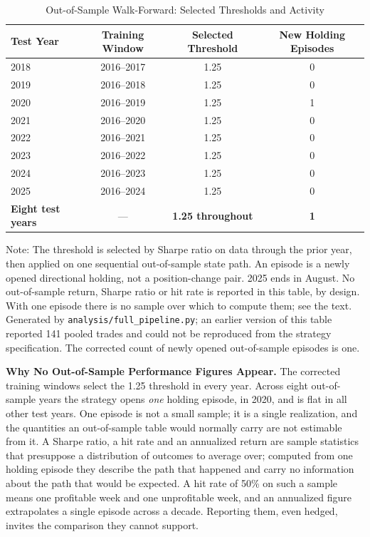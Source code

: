 \documentclass[11pt]{article}
\begin{document}
\begin{table}[H]
\centering
\caption{Out-of-Sample Walk-Forward: Selected Thresholds and Activity}
\label{tab:oos}
\small
\begin{tabular}{@{}lccc@{}}
\toprule
Test Year & Training Window & Selected Threshold & New Holding Episodes \\
\midrule
2018 & 2016--2017 & 1.25 & 0 \\
2019 & 2016--2018 & 1.25 & 0 \\
2020 & 2016--2019 & 1.25 & 1 \\
2021 & 2016--2020 & 1.25 & 0 \\
2022 & 2016--2021 & 1.25 & 0 \\
2023 & 2016--2022 & 1.25 & 0 \\
2024 & 2016--2023 & 1.25 & 0 \\
2025 & 2016--2024 & 1.25 & 0 \\
\midrule
\textbf{Eight test years} & --- & \textbf{1.25 throughout} & \textbf{1} \\
\bottomrule
\end{tabular}
\par\vspace{0.3em}
\parbox{\linewidth}{\footnotesize Note: The threshold is selected by Sharpe ratio on data through the prior year, then applied on one sequential out-of-sample state path. An episode is a newly opened directional holding, not a position-change pair. 2025 ends in August. No out-of-sample return, Sharpe ratio or hit rate is reported in this table, by design. With one episode there is no sample over which to compute them; see the text. Generated by \texttt{analysis/full\_pipeline.py}; an earlier version of this table reported 141 pooled trades and could not be reproduced from the strategy specification. The corrected count of newly opened out-of-sample episodes is one.}
\end{table}

\textbf{Why No Out-of-Sample Performance Figures Appear.} The corrected training windows select the 1.25 threshold in every year. Across eight out-of-sample years the strategy opens \emph{one} holding episode, in 2020, and is flat in all other test years. One episode is not a small sample; it is a single realization, and the quantities an out-of-sample table would normally carry are not estimable from it. A Sharpe ratio, a hit rate and an annualized return are sample statistics that presuppose a distribution of outcomes to average over; computed from one holding episode they describe the path that happened and carry no information about the path that would be expected. A hit rate of 50\% on such a sample means one profitable week and one unprofitable week, and an annualized figure extrapolates a single episode across a decade. Reporting them, even hedged, invites the comparison they cannot support.
\end{document}
